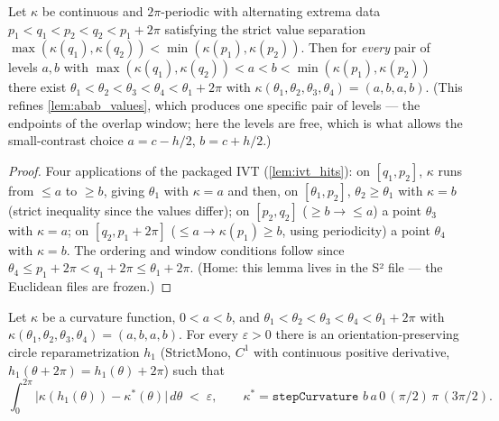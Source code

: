 \begin{lemma}
  \label{lem:exists_abab_levels}
  Let $\kappa$ be continuous and $2\pi$-periodic with alternating extrema data
  $p_1<q_1<p_2<q_2<p_1+2\pi$ satisfying the strict value separation
  $\max(\kappa(q_1),\kappa(q_2))<\min(\kappa(p_1),\kappa(p_2))$. Then for \emph{every}
  pair of levels $a,b$ with
  $\max(\kappa(q_1),\kappa(q_2))<a<b<\min(\kappa(p_1),\kappa(p_2))$ there exist
  $\theta_1<\theta_2<\theta_3<\theta_4<\theta_1+2\pi$ with
  $\kappa(\theta_1,\theta_2,\theta_3,\theta_4)=(a,b,a,b)$. (This refines
  \cref{lem:abab_values}, which produces one specific pair of levels — the endpoints of
  the overlap window; here the levels are free, which is what allows the small-contrast
  choice $a=c-h/2$, $b=c+h/2$.)
\end{lemma}

\begin{proof}

\leanok
  Four applications of the packaged IVT (\cref{lem:ivt_hits}): on $[q_1,p_2]$, $\kappa$
  runs from $\le a$ to $\ge b$, giving $\theta_1$ with $\kappa=a$ and then, on
  $[\theta_1,p_2]$, $\theta_2\ge\theta_1$ with $\kappa=b$ (strict inequality since the
  values differ); on $[p_2,q_2]$ ($\ge b\to\le a$) a point $\theta_3$ with $\kappa=a$;
  on $[q_2,p_1+2\pi]$ ($\le a\to\kappa(p_1)\ge b$, using periodicity) a point
  $\theta_4$ with $\kappa=b$. The ordering and window conditions follow since
  $\theta_4\le p_1+2\pi<q_1+2\pi\le\theta_1+2\pi$. (Home: this lemma lives in the S²
  file — the Euclidean files are frozen.)
\end{proof}

\begin{lemma}
  \label{lem:step_L1_reparam}
  Let $\kappa$ be a curvature function, $0<a<b$, and $\theta_1<\theta_2<\theta_3<
  \theta_4<\theta_1+2\pi$ with $\kappa(\theta_1,\theta_2,\theta_3,\theta_4)=(a,b,a,b)$.
  For every $\varepsilon>0$ there is an orientation-preserving circle reparametrization
  $h_1$ ($\mathrm{StrictMono}$, $C^1$ with continuous positive derivative,
  $h_1(\theta+2\pi)=h_1(\theta)+2\pi$) such that
  \[
    \int_0^{2\pi}\bigl|\kappa(h_1(\theta))-\kappa^\ast(\theta)\bigr|\,d\theta
    \;<\;\varepsilon,
    \qquad \kappa^\ast=\texttt{stepCurvature } b\,a\,0\,(\pi/2)\,\pi\,(3\pi/2).
  \]
\end{lemma}

